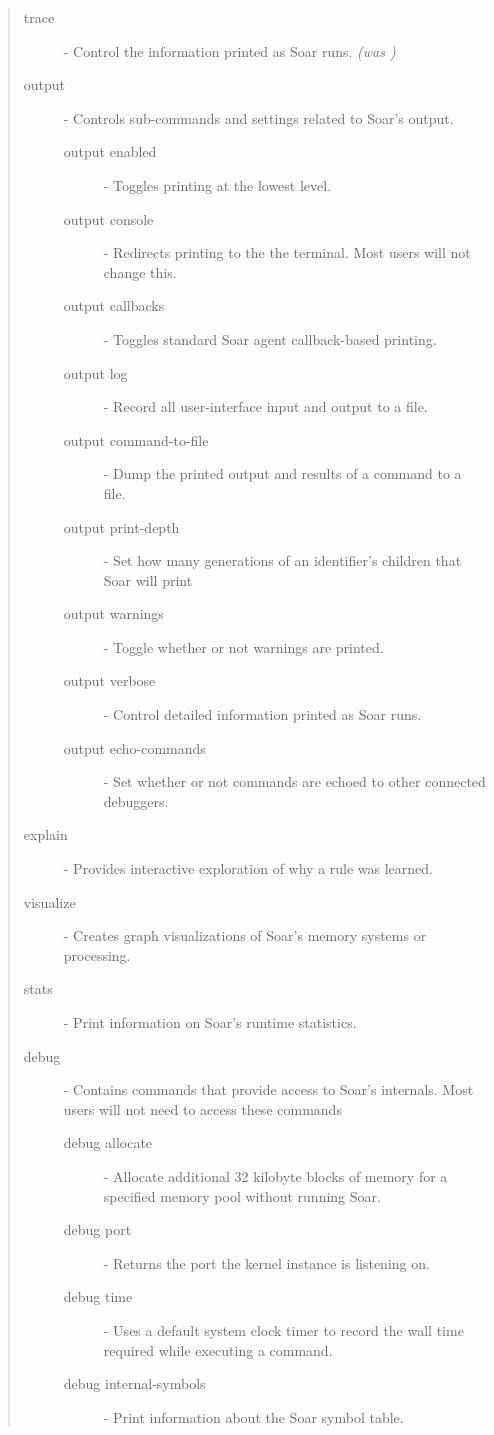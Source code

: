 \begin{quote}
	\begin{description}
	\item[trace] - Control the information printed as Soar runs. \emph{(was )}
	\item[output] - Controls sub-commands and settings related to Soar's output.
	\begin{description}
		\item[output enabled] - Toggles printing at the lowest level.
		\item[output console] - Redirects printing to the the terminal.  Most users will not change this.
		\item[output callbacks] - Toggles standard Soar agent callback-based printing.
		\item[output log] - Record all user-interface input and output to a file. 
		\item[output command-to-file] - Dump the printed output and results of a command to a file.
		\item[output print-depth] - Set how many generations of an identifier's children that Soar will print
		\item[output warnings] - Toggle whether or not warnings are printed.
		\item[output verbose] - Control detailed information printed as Soar runs.
		\item[output echo-commands] - Set whether or not commands are echoed to other connected debuggers. 
	\end{description}
	\item[explain] - Provides interactive exploration of why a rule was learned.
	\item[visualize] - Creates graph visualizations of Soar's memory systems or processing.
	\item[stats] - Print information on Soar's runtime statistics.
	\item[debug] - Contains commands that provide access to Soar's internals. Most users will not need to access these commands
	\begin{description}
		\item[debug allocate] - Allocate additional 32 kilobyte blocks of memory for a specified memory pool without running Soar.
		\item[debug port] - Returns the port the kernel instance is listening on.
		\item[debug time] - Uses a default system clock timer to record the wall time required while executing a command.
		\item[debug internal-symbols] - Print information about the Soar symbol table.
	\end{description}
	\end{description}
\end{quote}

